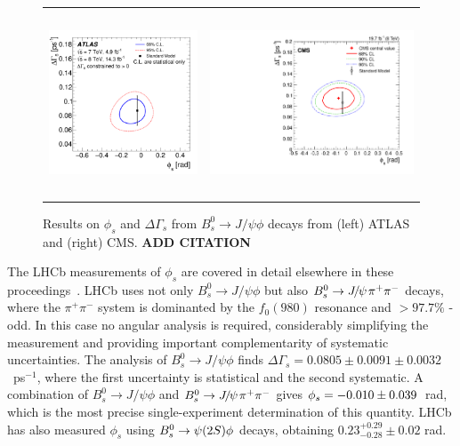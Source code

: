 \begin{figure}
  \begin{center}
    \begin{tabular}{c c}
      \includegraphics[height=5.5cm]{figs/atlas_phis_result.pdf} &
      \includegraphics[height=5.5cm]{figs/cms_phis_result.pdf} 
    \end{tabular}
  \end{center}
  \vspace{-0.5cm}
  \caption{\label{phis_atlas_cms}Results on $\phi_s$ and $\Delta\Gamma_s$ from
  $B^0_s \to J/\psi \phi$ decays from (left) ATLAS and (right) CMS. \textbf{ADD CITATION}}
\end{figure}

The LHCb measurements of $\phi_s$ are covered in detail elsewhere in these proceedings~\cite{LHCBPHISPROC}.
LHCb uses not only $B^0_s \to J/\psi \phi$ but also ${{B}^0_{s}}\rightarrow {\ensuremath{{J\mskip -3mu/\mskip -2mu\psi\mskip 2mu}}}\pi^+\pi^-$ decays,
where the $\pi^+\pi^-$ system is dominanted by the $f_0(980)$ resonance and $>97.7\%$ \CP-odd.
In this case no angular analysis is required, considerably simplifying the measurement
and providing important complementarity of systematic uncertainties.
The analysis of $B^0_s \to J/\psi \phi$ finds $\Delta\Gamma_s = 0.0805  \pm 0.0091         \pm  0.0032$~ps$^{-1}$,
where the first uncertainty is statistical and the second systematic. 
A combination of $B^0_s \to J/\psi \phi$ and ${{B}^0_{s}}\rightarrow {\ensuremath{{J\mskip -3mu/\mskip -2mu\psi\mskip 2mu}}}\pi^+\pi^-$ gives ${\phi_{{s}}} = -0.010  \pm  0.039$~rad, which is the most 
precise single-experiment determination of this quantity.
LHCb has also measured $\phi_s$ using ${{B}^0_{s}}\rightarrow \psi(2S)\phi$ decays, obtaining
$0.23^{+0.29}_{-0.28} \pm 0.02$ rad.

